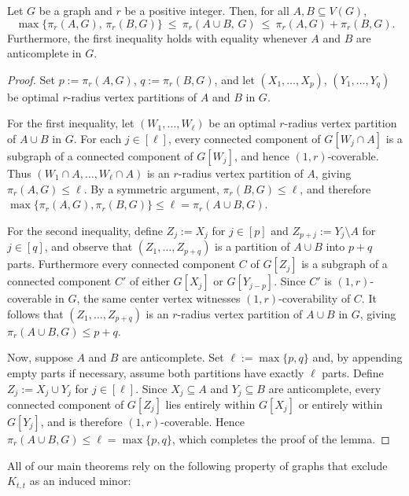 \begin{lemma}\label{lem:properties_of_pi}
    Let $G$ be a graph and $r$ be a positive integer. Then, for all $A, B \subseteq V(G)$,
    \[
        \max\bigl\{\pi_r(A,G),\,\pi_r(B,G)\bigr\} \
        \leq \ \pi_r(A \cup B,\,G) \
        \leq \ \pi_r(A,G) + \pi_r(B,G).
    \]
    Furthermore, the first inequality holds with equality whenever $A$ and $B$ are anticomplete in $G$.
\end{lemma}
\begin{proof}
    Set $p := \pi_r(A,G)$, $q := \pi_r(B,G)$, and let $(X_1,\dots,X_p)$, $(Y_1,\dots,Y_q)$ be optimal $r$-radius vertex partitions of $A$ and $B$ in $G$.

    For the first inequality, let $(W_1,\dots,W_\ell)$ be an optimal $r$-radius vertex partition of $A \cup B$ in $G$. For each $j \in [\ell]$, every connected component of $G[W_j \cap A]$ is a subgraph of a connected component of $G[W_j]$, and hence $(1,r)$-coverable. Thus $(W_1 \cap A, \dots, W_\ell \cap A)$ is an $r$-radius vertex partition of $A$, giving $\pi_r(A,G) \leq \ell$. By a symmetric argument, $\pi_r(B,G) \leq \ell$, and therefore $\max\{\pi_r(A,G),\pi_r(B,G)\} \leq \ell = \pi_r(A \cup B, G)$.

    For the second inequality, define $Z_j := X_j$ for $j \in [p]$ and $Z_{p+j} := Y_j \setminus A$ for $j \in [q]$, and observe that $(Z_1,\dots,Z_{p+q})$ is a partition of $A \cup B$ into $p + q$ parts. Furthermore every connected component $C$ of $G[Z_j]$ is a subgraph of a connected component $C'$ of either $G[X_j]$ or $G[Y_{j-p}]$. Since $C'$ is $(1,r)$-coverable in $G$, the same center vertex witnesses $(1,r)$-coverability of $C$. It follows that $(Z_1,\dots,Z_{p+q})$ is an $r$-radius vertex partition of $A \cup B$ in $G$, giving $\pi_r(A \cup B, G) \leq p + q$.
    
    Now, suppose $A$ and $B$ are anticomplete. Set $\ell := \max\{p,q\}$ and, by appending empty parts if necessary, assume both partitions have exactly $\ell$ parts. Define $Z_j := X_j \cup Y_j$ for $j \in [\ell]$. Since $X_j \subseteq A$ and $Y_j \subseteq B$ are anticomplete, every connected component of $G[Z_j]$ lies entirely within $G[X_j]$ or entirely within $G[Y_j]$, and is therefore $(1,r)$-coverable. Hence $\pi_r(A \cup B, G) \leq \ell = \max\{p,q\}$, which completes the proof of the lemma.
\end{proof}

All of our main theorems rely on the following property of graphs that exclude $K_{t,t}$ as an induced minor:

